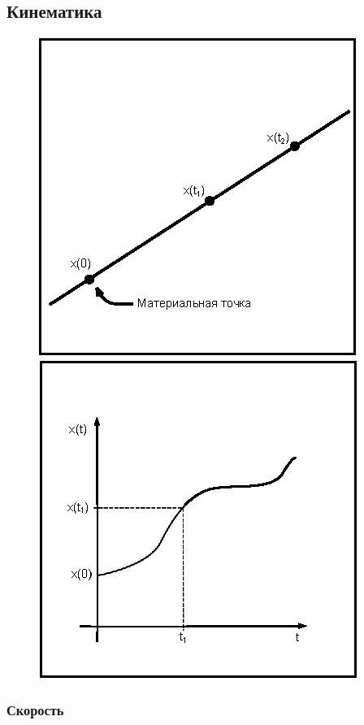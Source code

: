\documentclass[class=article,a4paper,12pt,crop=false]{standalone}
\begin{document}
  \subsection{Кинематика}
  \vspace*{.2in}
  \begin{figure}[h]
    \centering
    \includegraphics{lec_01_fig_01}
    \hspace*{.5in}
    \includegraphics{lec_01_fig_02}
  \end{figure}

  \subsubsection{Скорость}
\end{document}
